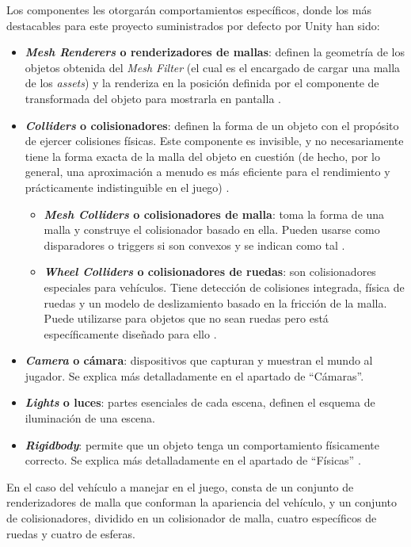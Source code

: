 Los componentes les otorgarán comportamientos específicos, donde los más destacables para este proyecto suministrados por defecto por Unity han sido: 
\begin{itemize}
\tightlist
    \item \textbf{\textit{Mesh Renderers} o renderizadores de mallas}: definen la geometría de los objetos obtenida del \textit{Mesh Filter} (el cual es el encargado de cargar una malla de los \textit{assets}) y la renderiza en la posición definida por el componente de transformada del objeto para mostrarla en pantalla \cite{doc:meshrenderers}.
    \item \textbf{\textit{Colliders} o colisionadores}: definen la forma de un objeto con el propósito de ejercer colisiones físicas. Este componente es invisible, y no necesariamente tiene la forma exacta de la malla del objeto en cuestión (de hecho, por lo general, una aproximación a menudo es más eficiente para el rendimiento y prácticamente indistinguible en el juego) \cite{doc:colliders}.
   	\begin{itemize}
   	\tightlist
   		    \item \textbf{\textit{Mesh Colliders} o colisionadores de malla}: toma la forma de una malla y construye el colisionador basado en ella. Pueden usarse como disparadores o triggers si son convexos y se indican como tal \cite{doc:meshcolliders}.
   		    \item \textbf{\textit{Wheel Colliders} o colisionadores de ruedas}: son colisionadores especiales para vehículos. Tiene detección de colisiones integrada, física de ruedas y un modelo de deslizamiento basado en la fricción de la malla. Puede utilizarse para objetos que no sean ruedas pero está específicamente diseñado para ello \cite{doc:wheelcolliders}.
   	\end{itemize}
   	\item \textbf{\textit{Camera} o cámara}: dispositivos que capturan y muestran el mundo al jugador. Se explica más detalladamente en el apartado de ``Cámaras''.
   	\item \textbf{\textit{Lights} o luces}: partes esenciales de cada escena, definen el esquema de iluminación de una escena.
   	\item \textbf{\textit{Rigidbody}}: permite que un objeto tenga un comportamiento físicamente correcto. Se explica más detalladamente en el apartado de ``Físicas'' \cite{doc:lights}.
\end{itemize}

En el caso del vehículo a manejar en el juego, consta de un conjunto de renderizadores de malla que conforman la apariencia del vehículo, y un conjunto de colisionadores, dividido en un colisionador de malla, cuatro específicos de ruedas y cuatro de esferas.

